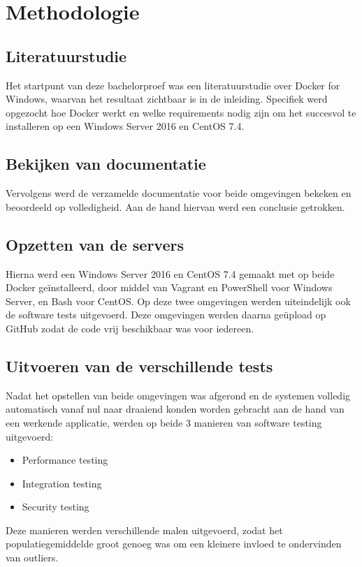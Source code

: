 
\chapter{Methodologie}
\label{ch:methodologie}


\section{Literatuurstudie}
Het startpunt van deze bachelorproef was een literatuurstudie over Docker for Windows, waarvan het resultaat zichtbaar is in de inleiding. Specifiek werd opgezocht hoe Docker werkt en welke requirements nodig zijn om het succesvol te installeren op een Windows Server 2016 en CentOS 7.4.

\section{Bekijken van documentatie}
Vervolgens werd de verzamelde documentatie voor beide omgevingen bekeken en beoordeeld op volledigheid. Aan de hand hiervan werd een conclusie getrokken.

\section{Opzetten van de servers}
Hierna werd een Windows Server 2016 en CentOS 7.4 gemaakt met op beide Docker geïnstalleerd, door middel van Vagrant en PowerShell voor Windows Server, en Bash voor CentOS. Op deze twee omgevingen werden uiteindelijk ook de software tests uitgevoerd. Deze omgevingen werden daarna geüpload op GitHub zodat de code vrij beschikbaar was voor iedereen.

\section{Uitvoeren van de verschillende tests}
Nadat het opstellen van beide omgevingen was afgerond en de systemen volledig automatisch vanaf nul naar draaiend konden worden gebracht aan de hand van een werkende applicatie, werden op beide 3 manieren van software testing uitgevoerd:
\begin{itemize}[noitemsep]
	\item Performance testing
	\item Integration testing
	\item Security testing
\end{itemize}
Deze manieren werden verschillende malen uitgevoerd, zodat het populatiegemiddelde groot genoeg was om een kleinere invloed te ondervinden van outliers.

